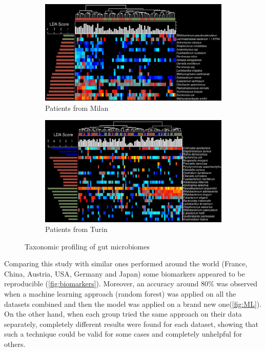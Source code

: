     \begin{figure}[!h]
    \centering
    \begin{subfigure}{.45\textwidth}
        \centering
        \includegraphics[width=\linewidth]{MilanCRC.png}
        \caption{\label{fig:milanCRC}Patients from Milan}
    \end{subfigure}
    \begin{subfigure}{.45\textwidth}
        \centering
        \includegraphics[width=\linewidth]{TurinCRC.png}
        \caption{\label{fig:turinCRC}Patients from Turin}
    \end{subfigure}
    \caption{Taxonomic profiling of gut microbiomes}
    \end{figure}

    Comparing this study with similar ones performed around the world (France, China, Austria, USA, Germany and Japan) some biomarkers appeared to be reproducible (\ref{fig:biomarkers}).
    Moreover, an accuracy around $80\%$ was observed when a machine learning approach (random forest) was applied on all the datasets combined and then the model was applied on a brand new one(\ref{fig:ML}).
    On the other hand, when each group tried the same approach on their data separately, completely different results were found for each dataset, showing that such a technique could be valid for some cases and completely unhelpful for others.

